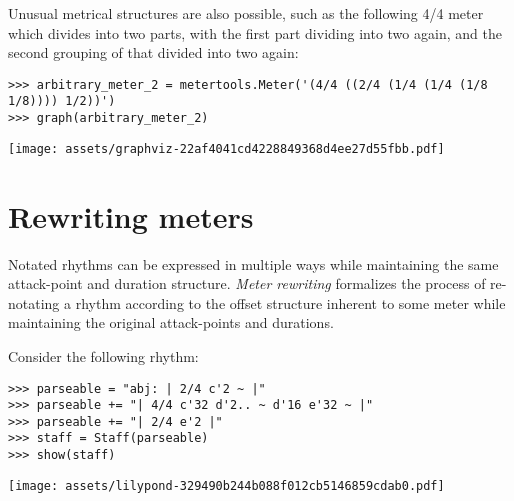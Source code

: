 \noindent Unusual metrical structures are also possible, such as the following
4/4 meter which divides into two parts, with the first part dividing into two
again, and the second grouping of that divided into two again:

\begin{comment}
<abjad>
arbitrary_meter_2 = metertools.Meter('(4/4 ((2/4 (1/4 (1/4 (1/8 1/8)))) 1/2))')
graph(arbitrary_meter_2)
</abjad>
\end{comment}

\begin{singlespacing}
\vspace{-0.5\baselineskip}
\begin{lstlisting}
>>> arbitrary_meter_2 = metertools.Meter('(4/4 ((2/4 (1/4 (1/4 (1/8 1/8)))) 1/2))')
>>> graph(arbitrary_meter_2)
\end{lstlisting}
\noindent\texttt{[image: assets/graphviz-22af4041cd4228849368d4ee27d55fbb.pdf]}
\end{singlespacing}

\section{Rewriting meters}

Notated rhythms can be expressed in multiple ways while maintaining the same
attack-point and duration structure. \emph{Meter rewriting} formalizes the
process of re-notating a rhythm according to the offset structure inherent to
some meter while maintaining the original attack-points and durations.

Consider the following rhythm:

\begin{comment}
<abjad>
parseable = "abj: | 2/4 c'2 ~ |"
parseable += "| 4/4 c'32 d'2.. ~ d'16 e'32 ~ |"
parseable += "| 2/4 e'2 |"
staff = Staff(parseable)
show(staff)
</abjad>
\end{comment}

\begin{singlespacing}
\vspace{-0.5\baselineskip}
\begin{lstlisting}
>>> parseable = "abj: | 2/4 c'2 ~ |"
>>> parseable += "| 4/4 c'32 d'2.. ~ d'16 e'32 ~ |"
>>> parseable += "| 2/4 e'2 |"
>>> staff = Staff(parseable)
>>> show(staff)
\end{lstlisting}
\noindent\texttt{[image: assets/lilypond-329490b244b088f012cb5146859cdab0.pdf]}
\end{singlespacing}

